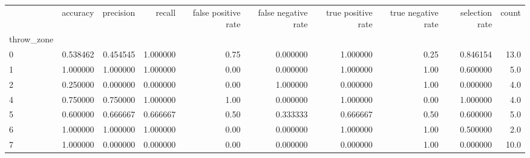 \begin{tabular}{lrrrrrrrrr}
\toprule
{} &  accuracy &  precision &    recall &  false positive rate &  false negative rate &  true positive rate &  true negative rate &  selection rate &  count \\
throw\_zone &           &            &           &                      &                      &                     &                     &                 &        \\
\midrule
0          &  0.538462 &   0.454545 &  1.000000 &                 0.75 &             0.000000 &            1.000000 &                0.25 &        0.846154 &   13.0 \\
1          &  1.000000 &   1.000000 &  1.000000 &                 0.00 &             0.000000 &            1.000000 &                1.00 &        0.600000 &    5.0 \\
2          &  0.250000 &   0.000000 &  0.000000 &                 0.00 &             1.000000 &            0.000000 &                1.00 &        0.000000 &    4.0 \\
4          &  0.750000 &   0.750000 &  1.000000 &                 1.00 &             0.000000 &            1.000000 &                0.00 &        1.000000 &    4.0 \\
5          &  0.600000 &   0.666667 &  0.666667 &                 0.50 &             0.333333 &            0.666667 &                0.50 &        0.600000 &    5.0 \\
6          &  1.000000 &   1.000000 &  1.000000 &                 0.00 &             0.000000 &            1.000000 &                1.00 &        0.500000 &    2.0 \\
7          &  1.000000 &   0.000000 &  0.000000 &                 0.00 &             0.000000 &            0.000000 &                1.00 &        0.000000 &   10.0 \\
\bottomrule
\end{tabular}
